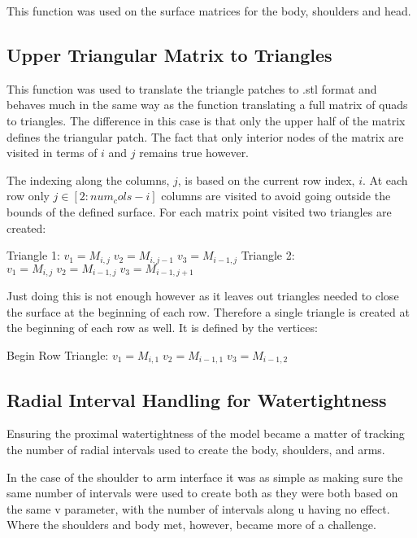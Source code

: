 \documentclass[twocolumn]{article}
\begin{document}
This function was used on the surface matrices for the body, shoulders and head. 

\subsection{Upper Triangular Matrix to Triangles}

This function was used to translate the triangle patches to .stl format and behaves much in the same way as the function translating a full matrix of quads to triangles. The difference in this case is that only the upper half of the matrix defines the triangular patch. The fact that only interior nodes of the matrix are visited in terms of $i$ and $j$ remains true however.

The indexing along the columns, $j$, is based on the current row index, $i$.  At each row only $j \in [2:num_cols-i]$ columns are visited to avoid going outside the bounds of the defined surface. For each matrix point visited two triangles are created: 

\vspace{2mm}
\begin{flushleft}
Triangle 1:
$v_1 = M_{i,j} \; v_2= M_{i,j-1} \; v_3 = M_{i-1,j} $
Triangle 2:
$v_1 = M_{i,j} \; v_2= M_{i-1,j} \; v_3 = M_{i-1,j+1} $
\end{flushleft}
\vspace{2mm}

Just doing this is not enough however as it leaves out triangles needed to close the surface at the beginning of each row. Therefore a single triangle is created at the beginning of each row as well. It is defined by the vertices:

\vspace{2mm}
\begin{flushleft}
Begin Row Triangle:
$v_1 = M_{i,1} \; v_2= M_{i-1,1} \; v_3 = M_{i-1,2} $
\end{flushleft}
\vspace{2mm}

\subsection{Radial Interval Handling for Watertightness}

Ensuring the proximal watertightness of the model became a matter of tracking the number of radial intervals used to create the body, shoulders, and arms.

In the case of the shoulder to arm interface it was as simple as making sure the same number of intervals were used to create both as they were both based on the same v parameter, with the number of intervals along u having no effect. Where the shoulders and body met, however, became more of a challenge.
\end{document}
